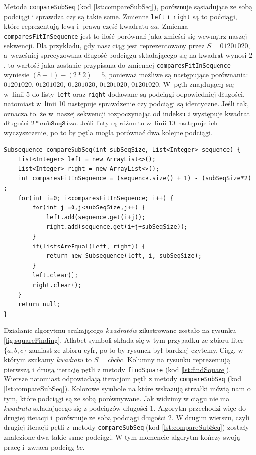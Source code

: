 \documentclass[document]{xmgr}
\begin{document}
Metoda \texttt{compareSubSeq} (kod \ref{lst:compareSubSeq}), porównuje sąsiadujące ze sobą podciągi i sprawdza czy są takie same. Zmienne \texttt{left} i~\texttt{right} są to podciągi, które reprezentują lewą i~prawą część kwadratu $aa$. Zmienna \texttt{comparesFitInSequence} jest to ilość porównań jaka zmieści się wewnątrz naszej sekwencji. Dla przykładu, gdy nasz ciąg jest reprezentowany przez $S=01201020$, a~wcześniej sprecyzowana długość podciągu składającego się na kwadrat wynosi $2$, to wartość jaka zostanie przypisana do zmiennej \mbox{\texttt{comparesFitInSequence}} wyniesie $(8 + 1) - (2 * 2)=5$, ponieważ możliwe są następujące porównania: $\underline{0120}1020$, $0\underline{1201}020$, $01\underline{2010}20$, $012\underline{0102}0$, $0120\underline{1020}$. W~pętli znajdującej się w~linii 5 do lis\-ty \texttt{left} oraz \mbox{\texttt{right}} dodawane są podciągi odpowiedniej długości, natomiast w~linii 10 następuje sprawdzenie czy podciągi są identyczne. Jeśli tak, oznacza to, że w~naszej sekwencji rozpoczynając od indeksu $i$ występuje kwadrat długości $2 * \texttt{subSeqSize}$. Jeśli listy są różne to w~linii 13 następuje ich wyczyszczenie, po to by pętla mogła porównać dwa kolejne podciągi.

\begin{lstlisting}[caption={Metoda pomocnicza przy szukaniu \emph{kwadratów} wewnątrz listy.},label=lst:compareSubSeq]
Subsequence compareSubSeq(int subSeqSize, List<Integer> sequence) {
	List<Integer> left = new ArrayList<>();
	List<Integer> right = new ArrayList<>();
	int comparesFitInSequence = (sequence.size() + 1) - (subSeqSize*2) ;
	for(int i=0; i<comparesFitInSequence; i++) {
		for(int j =0;j<subSeqSize;j++) {
			left.add(sequence.get(i+j));
			right.add(sequence.get(i+j+subSeqSize));
		}
		if(listsAreEqual(left, right)) {
			return new Subsequence(left, i, subSeqSize);
		}
		left.clear();
		right.clear();
	}
	return null;
}
\end{lstlisting}

Działanie algorytmu szukającego \emph{kwadratów} zilustrowane zostało na rysunku \ref{fig:squareFinding}. Alfabet symboli składa się w tym przypadku ze zbioru liter $\{a, b, c\}$ zamiast ze zbioru cyfr, po to by rysunek był bardziej czytelny. Ciąg, w którym szukamy \emph{kwadratu} to $S=abcbc$. Kolumny na rysunku reprezentują pierwszą i~drugą iterację pętli z metody \texttt{findSquare} (kod \ref{lst:findSquare}). Wiersze natomiast odpowiadają iteracjom pętli z metody \texttt{compareSubSeq} (kod \ref{lst:compareSubSeq}). Kolorowe symbole na które wskazują strzałki mówią nam o tym, które podciągi są ze sobą porównywane. Jak widzimy w ciągu nie ma \emph{kwadratu} składającego się z podciągów długości $1$. Algorytm przechodzi więc do drugiej iteracji i~porównuje ze sobą podciągi długości $2$. W drugim wierszu, czyli drugiej iteracji pętli z~metody \texttt{compareSubSeq} (kod \ref{lst:compareSubSeq}) zostały znalezione dwa takie same podciągi. W tym momencie algorytm kończy swoją pracę i~zwraca podciąg $bc$.
\end{document}
